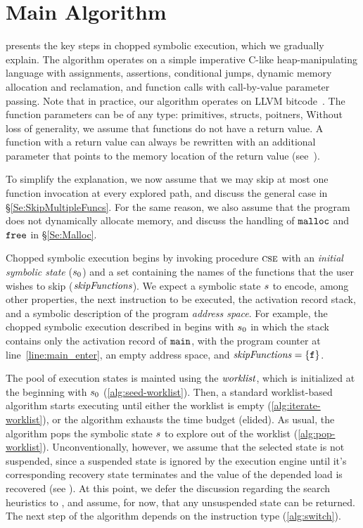 
\section{Main Algorithm}\label{section:main-algorithm}

 presents the key steps in chopped
symbolic execution, which we gradually explain. The algorithm operates
on a simple imperative C-like heap-manipulating language with
assignments, assertions, conditional jumps, dynamic memory allocation
and reclamation, and function calls with call-by-value parameter
passing.
Note that in practice, our algorithm operates on LLVM bitcode~\cite{llvm}.
The function parameters can be of any type: primitives, structs, poitners, \etc
Without loss of generality, we assume that functions do not have a return value.
A function with a return value can always be rewritten with an additional parameter 
that points to the memory location of the return value (see~).

To simplify the explanation, we now
assume that we may skip at most one function invocation at every
explored path, and discuss the general case in
\S\ref{Se:SkipMultipleFuncs}. For the same reason, we also assume that
the program does not dynamically allocate memory, and discuss the
handling of $\texttt{malloc}$ and $\texttt{free}$ in \S\ref{Se:Malloc}.

Chopped symbolic execution begins by invoking procedure $\textsc{cse}$
with an \emph{initial symbolic state} ($s_0$) and a set
containing the names of the functions that the user wishes to skip
($\mathit{skipFunctions}$). We expect a symbolic state $s$ to encode,
among other properties, the next instruction to be executed, the activation record stack,
and a symbolic description of the program \emph{address space}. For example, the
chopped symbolic execution described in  begins
with $s_0$ in which the stack contains only the activation record
of $\texttt{main}$, with the program counter at
line~\ref{line:main_enter}, an empty address space, and
$\mathit{skipFunctions} = \{ \texttt{f} \}$.

The pool of execution states is mainted using the $\mathit{worklist}$,
which is initialized at the beginning with $s_0$ (\cref{alg:seed-worklist}).
Then, a standard worklist-based algorithm starts executing until either the
worklist is empty (\cref{alg:iterate-worklist}), or the algorithm
exhausts the time budget (elided). As usual, the algorithm pops the
symbolic state $s$ to explore out of the worklist
(\cref{alg:pop-worklist}).
Unconventionally, however, we assume that
the selected state is not suspended, since a suspended state is ignored by the execution engine
until it's corresponding recovery state terminates
and the value of the depended load is recovered (see ).
At this point, we defer the discussion regarding the search heuristics to ,
and assume, for now, that any unsuspended state can be returned.
The next step of the algorithm depends on the instruction type (\cref{alg:switch}).

